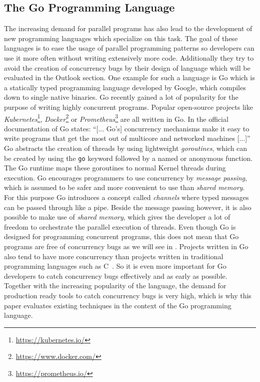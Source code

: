 \documentclass[conference]{IEEEtran}
\begin{document}
\subsection{The Go Programming Language}
The increasing demand for parallel programs has also lead to the development of new programming languages which specialize on this task.
The goal of these languages is to ease the usage of parallel programming patterns so developers can use it more often without writing extensively more code.
Additionally they try to avoid the creation of concurrency bugs by their design of language which will be evaluated in the Outlook section.
One example for such a language is Go which is a statically typed programming language developed by Google, which compiles down to single native binaries.
Go recently gained a lot of popularity for the purpose of writing highly concurrent programs.
Popular open-source projects like \emph{Kubernetes}\footnote{\url{https://kubernetes.io/}}, \emph{Docker}\footnote{\url{https://www.docker.com/}} or \emph{Prometheus}\footnote{\url{https://prometheus.io/}} are all written in Go.
In the official documentation of Go states: ``[... Go's] concurrency mechanisms make it easy to write programs that get the most out of multicore and networked machines [...]''~\cite{goDocs}
Go abstracts the creation of threads by using lightweight \emph{goroutines}, which can be created by using the \lstinline{go} keyword followed by a named or anonymous function.
The Go runtime maps these goroutines to normal Kernel threads during execution.
Go encourages programmers to use concurrency by \emph{message passing}, which is assumed to be safer and more convenient to use than \emph{shared memory}.
For this purpose Go introduces a concept called \emph{channels} where typed messages can be passed through like a pipe.
Beside the message passing however, it is also possible to make use of \emph{shared memory}, which gives the developer a lot of freedom to orchestrate the parallel execution of threads.
Even though Go is designed for programming concurrent programs, this does not mean that Go programs are free of concurrency bugs as we will see in .
Projects written in Go also tend to have more concurrency than projects written in traditional programming languages such as C~\cite{tu2019go}.
So it is even more important for Go developers to catch concurrency bugs effectively and as early as possible.
Together with the increasing popularity of the language, the demand for production ready tools to catch concurrency bugs is very high, which is why this paper evaluates existing techniques in the context of the Go programming language.
\end{document}
